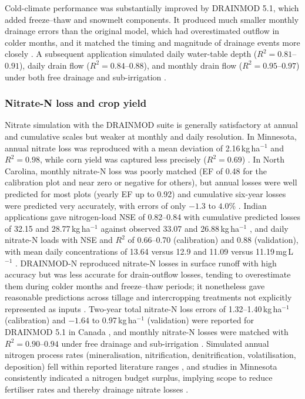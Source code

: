 Cold-climate performance was substantially improved by DRAINMOD 5.1, which added freeze--thaw and snowmelt components. It produced much smaller monthly drainage errors than the original model, which had overestimated outflow in colder months, and it matched the timing and magnitude of drainage events more closely \parencite{Wang2006c}. A subsequent application simulated daily water-table depth ($R^2 = 0.81$--$0.91$), daily drain flow ($R^2 = 0.84$--$0.88$), and monthly drain flow ($R^2 = 0.95$--$0.97$) under both free drainage and sub-irrigation \parencite{Dayyani2010b}.

\subsubsection{Nitrate-N loss and crop yield}

Nitrate simulation with the DRAINMOD suite is generally satisfactory at annual and cumulative scales but weaker at monthly and daily resolution. In Minnesota, annual nitrate loss was reproduced with a mean deviation of 2.16\,kg\,ha$^{-1}$ and $R^2 = 0.98$, while corn yield was captured less precisely ($R^2 = 0.69$) \parencite{Zhao2000}. In North Carolina, monthly nitrate-N loss was poorly matched (EF of 0.48 for the calibration plot and near zero or negative for others), but annual losses were well predicted for most plots (yearly EF up to 0.92) and cumulative six-year losses were predicted very accurately, with errors of only $-1.3$ to $4.0\%$ \parencite{Youssef2006}. Indian applications gave nitrogen-load NSE of 0.82--0.84 with cumulative predicted losses of 32.15 and 28.77\,kg\,ha$^{-1}$ against observed 33.07 and 26.88\,kg\,ha$^{-1}$ \parencite{Dar2022}, and daily nitrate-N loads with NSE and $R^2$ of 0.66--0.70 (calibration) and 0.88 (validation), with mean daily concentrations of 13.64 versus 12.9 and 11.09 versus 11.19\,mg\,L$^{-1}$ \parencite{Dar2025}. DRAINMOD-N reproduced nitrate-N losses in surface runoff with high accuracy but was less accurate for drain-outflow losses, tending to overestimate them during colder months and freeze--thaw periods; it nonetheless gave reasonable predictions across tillage and intercropping treatments not explicitly represented as inputs \parencite{Yang2007}. Two-year total nitrate-N loss errors of 1.32--1.40\,kg\,ha$^{-1}$ (calibration) and $-1.64$ to 0.97\,kg\,ha$^{-1}$ (validation) were reported for DRAINMOD 5.1 in Canada \parencite{Wang2006c}, and monthly nitrate-N losses were matched with $R^2 = 0.90$--$0.94$ under free drainage and sub-irrigation \parencite{Dayyani2010b}. Simulated annual nitrogen process rates (mineralisation, nitrification, denitrification, volatilisation, deposition) fell within reported literature ranges \parencite{Salazar2009}, and studies in Minnesota consistently indicated a nitrogen budget surplus, implying scope to reduce fertiliser rates and thereby drainage nitrate losses \parencite{Ale2013}.


